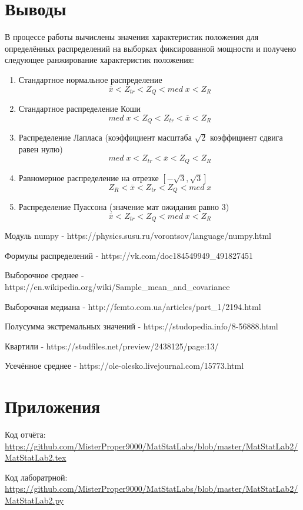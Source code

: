\documentclass[a4]{article}
\begin{document}
\section{Выводы}

\par В процессе работы вычислены значения характеристик положения для определённых распределений на выборках фиксированной мощности и получено следующее ранжирование характеристик положения:

\begin{enumerate}
    \item Стандартное нормальное распределение $$\overline{x} < Z_{tr} < Z_Q < med\;x < Z_R$$
    
    \item Стандартное распределение Коши $$med\;x < Z_Q < Z_{tr} < \overline{x} < Z_R$$
    
    \item Распределение Лапласа (коэффициент масштаба $\sqrt{2}$ коэффициент сдвига равен нулю) $$med\;x < Z_{tr} < \overline{x} < Z_Q < Z_R$$
    
    \item Равномерное распределение на отрезке $\left[-\sqrt{3},\sqrt{3}\right]$ $$Z_R < \overline{x} < Z_{tr} < Z_Q < med\;x$$
    
    \item Распределение Пуассона (значение мат ожидания равно $3$) $$\overline{x} < Z_{tr} < Z_Q < med\;x < Z_R$$
    
\end{enumerate}



\begin{thebibliography}{}
      Модуль numpy  -  https://physics.susu.ru/vorontsov/language/numpy.html
    
    Формулы распределений  -  https://vk.com/doc184549949\_491827451
    
    Выборочное среднее  -  https://en.wikipedia.org/wiki/Sample\_mean\_and\_covariance
    
    Выборочная медиана  -  http://femto.com.ua/articles/part\_1/2194.html
    
    Полусумма экстремальных значений  -  https://studopedia.info/8-56888.html
    
    Квартили  -  https://studfiles.net/preview/2438125/page:13/
    
      Усечённое среднее  -  https://ole-olesko.livejournal.com/15773.html
\end{thebibliography}

\section{Приложения}

 
Код отчёта:\; \url{https://github.com/MisterProper9000/MatStatLabs/blob/master/MatStatLab2/MatStatLab2.tex}

Код лаборатрной:\; \url{https://github.com/MisterProper9000/MatStatLabs/blob/master/MatStatLab2/MatStatLab2.py}


\end{document}
